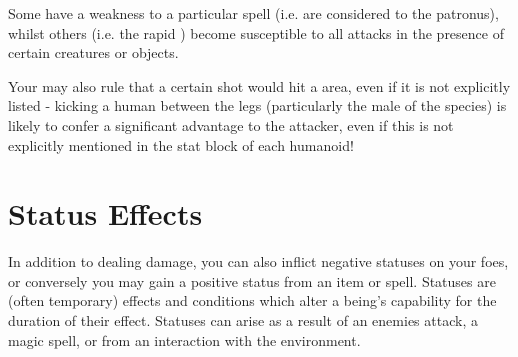 Some have a weakness to a particular spell (i.e.  are considered  to the patronus), whilst others (i.e. the rapid ) become susceptible to all attacks in the presence of certain creatures or objects. 

Your  may also rule that a certain  shot would hit a  area, even if it is not explicitly listed - kicking a human between the legs (particularly the male of the species) is likely to confer a significant advantage to the attacker, even if this is not explicitly mentioned in the stat block of each humanoid!


\section{Status Effects}

In addition to dealing damage, you can also inflict negative statuses on your foes, or conversely you may gain a positive status from an item or spell. Statuses are (often temporary) effects and conditions which alter a being's capability for the duration of their effect. Statuses can arise as a result of an enemies attack, a magic spell, or from an interaction with the environment. 



\newcommand\status[3]
{
	\subsubsection{#1}
	
	{\it #2}
	
	\begin{itemize}
	\renewcommand\labelitemi{\minus{}}
		#3
	\end{itemize}
}





